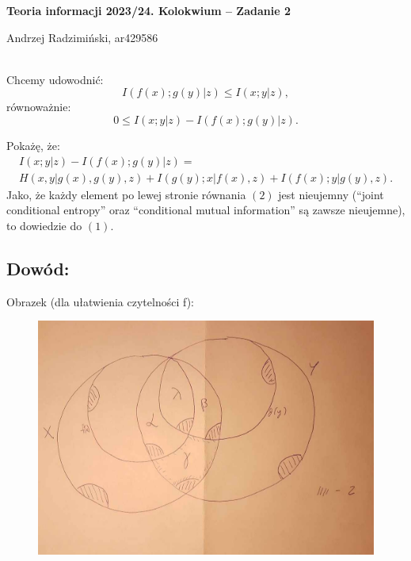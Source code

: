 



\setlength{\parindent}{0pt}
\noindent

{\bf Teoria informacji 2023/24. Kolokwium -- Zadanie 2}

Andrzej Radzimiński, ar429586
\\

\ \\

\newcommand{\ot}{\frac{1}{3}}
\newcommand{\twt}{\frac{2}{3}}

\renewcommand*{\arraystretch}{1.5}

Chcemy udowodnić:
\begin{equation}
	I(f(x) ; g(y) | z) \leq I(x ; y | z),
\end{equation}
równoważnie:
$$
	0 \leq I(x ; y | z) - I(f(x) ; g(y) | z).
$$

Pokażę, że:
\begin{multline}
	I(x ; y | z) - I(f(x) ; g(y) | z) = \\
	H(x, y | g(x), g(y), z) +
	I(g(y) ; x | f(x), z) +
	I(f(x) ; y | g(y), z).
\end{multline}
Jako, że każdy element po lewej stronie równania $(2)$ jest nieujemny (``joint conditional entropy'' oraz ``conditional mutual information'' są zawsze nieujemne), to dowiedzie do $(1)$.

\subsection*{Dowód:}

Obrazek (dla ułatwienia czytelności f):

\begin{figure}[ht!]
	\centering
	\includegraphics[width=160mm]{obrazek.jpg}
\end{figure}




